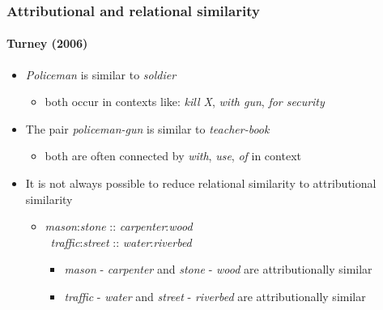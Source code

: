 \begin{frame}
  \frametitle{Attributional and relational similarity}
  \framesubtitle{Turney (2006)}

  \begin{itemize}
  \item \emph{Policeman} is  similar to
    \emph{soldier}
    \begin{itemize}
    \item both occur in contexts like:
    \emph{kill X}, \emph{with gun}, \emph{for security}
    \end{itemize}
    \pause
  \item The pair \emph{policeman-gun} is 
    similar to \emph{teacher-book}
    \begin{itemize}
    \item both are often connected by \emph{with}, \emph{use},
      \emph{of} in context
    \end{itemize}
    \pause
    \item It is not always possible to reduce relational similarity to attributional similarity
    \begin{itemize}
\item \emph{mason}:\emph{stone} :: \emph{carpenter}:\emph{wood}\\
  \vs\ \emph{traffic}:\emph{street} :: \emph{water}:\emph{riverbed}
\begin{itemize}
\item \emph{mason} - \emph{carpenter} and \emph{stone} - \emph{wood} are attributionally similar
\item \emph{traffic} - \emph{water} and \emph{street} - \emph{riverbed} are  attributionally similar
\end{itemize}
\end{itemize}

  \end{itemize}
\end{frame}




